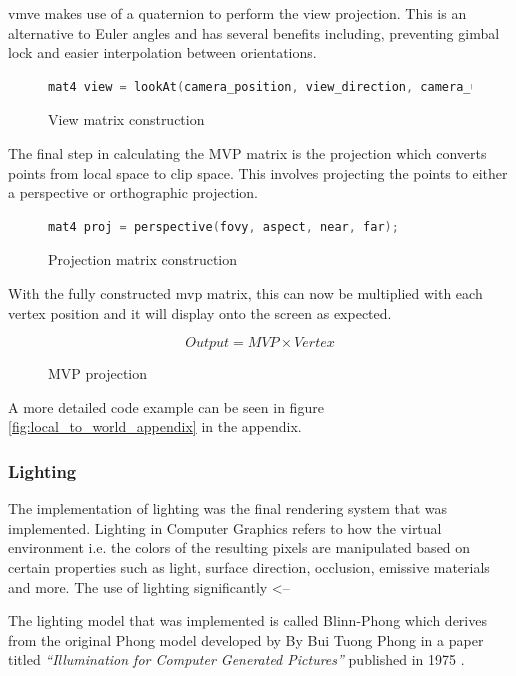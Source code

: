\documentclass[11pt]{article}
\begin{document}
\gls*{vmve} makes use of a quaternion to perform the view projection. This is an
alternative to Euler angles and has several benefits including, preventing gimbal
lock and easier interpolation between orientations.
\begin{figure}[ht]
  \centering
  \begin{lstlisting}[language=C++]
    mat4 view = lookAt(camera_position, view_direction, camera_up);
  \end{lstlisting}
  \caption{View matrix construction}
  \label{fig:world_to_view}
\end{figure}


The final step in calculating the MVP matrix is the projection which converts
points from local space to clip space. This involves projecting the points to
either a perspective or orthographic projection.
\begin{figure}[ht]
  \centering
  \begin{lstlisting}[language=C++]
    mat4 proj = perspective(fovy, aspect, near, far);
  \end{lstlisting}
  \caption{Projection matrix construction}
  \label{fig:local_to_projection}
\end{figure}

With the fully constructed mvp matrix, this can now be multiplied with each
vertex position and it will display onto the screen as expected.
\begin{figure}[H]
  \centering  
  \begin{equation}
    Output = MVP \times Vertex
  \end{equation}
  \caption{MVP projection}
  \label{fig:mvp_projection}
\end{figure}

A more detailed code example can be seen in figure
\ref{fig:local_to_world_appendix} in the appendix.

\subsubsection{Lighting}
The implementation of lighting was the final rendering system that was
implemented. Lighting in Computer Graphics refers to how the virtual environment
i.e. the colors of the resulting pixels are manipulated based on certain
properties such as light, surface direction, occlusion, emissive materials and
more. The use of lighting significantly <--

The lighting model that was implemented is called Blinn-Phong which
derives from the original Phong model developed by By Bui Tuong Phong in a paper
titled \textit{``Illumination for Computer Generated Pictures''} published in
1975 \cite{blinn}. 
\end{document}
